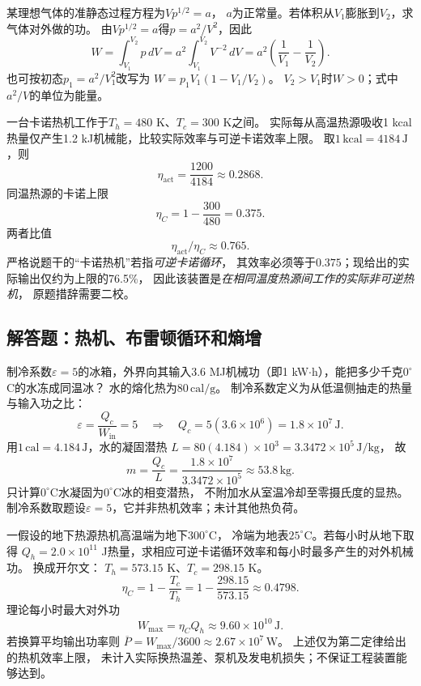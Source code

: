 \problemtext 某理想气体的准静态过程方程为$Vp^{1/2}=a$，
$a$为正常量。若体积从$V_1$膨胀到$V_2$，求气体对外做的功。
\workings
由$Vp^{1/2}=a$得$p=a^2/V^2$，因此
\[
W=\int_{V_1}^{V_2}p\,dV
=a^2\int_{V_1}^{V_2}V^{-2}\,dV
=\boxed{a^2\left(\frac1{V_1}-\frac1{V_2}\right)}.
\]
也可按初态$p_1=a^2/V_1^2$改写为
$\boxed{W=p_1V_1(1-V_1/V_2)}$。
\crosscheck $V_2>V_1$时$W>0$；式中$a^2/V$的单位为能量。

\problemtext 一台卡诺热机工作于$T_h=480$ K、$T_c=300$ K之间。
实际每从高温热源吸收1 kcal热量仅产生1.2 kJ机械能，比较实际效率与可逆卡诺效率上限。
\workings
取$1\,\mathrm{kcal}=4184\,\mathrm J$，则
\[
\boxed{\eta_{\mathrm{act}}=\frac{1200}{4184}
\approx0.2868}.
\]
同温热源的卡诺上限
\[
\boxed{\eta_C=1-\frac{300}{480}=0.375}.
\]
两者比值
\[
\boxed{\eta_{\mathrm{act}}/\eta_C\approx0.765}.
\]
\crosscheck 严格说题干的“卡诺热机”若指\emph{可逆卡诺循环}，
其效率必须等于$0.375$；现给出的实际输出仅约为上限的76.5\%，
因此该装置是\emph{在相同温度热源间工作的实际非可逆热机}，
原题措辞需要二校。

\subsection{解答题：热机、布雷顿循环和熵增}

\problemtext 制冷系数$\varepsilon=5$的冰箱，外界向其输入3.6 MJ机械功（即1 kW$\cdot$h），能把多少千克$0^\circ$C的水冻成同温冰？
水的熔化热为$80\,\mathrm{cal/g}$。
\workings
制冷系数定义为从低温侧抽走的热量与输入功之比：
\[
\varepsilon=\frac{Q_c}{W_{\mathrm{in}}}=5
\quad\Longrightarrow\quad
Q_c=5(3.6\times10^6)=1.8\times10^7\,\mathrm J.
\]
用$1\,\mathrm{cal}=4.184\,\mathrm J$，水的凝固潜热
$L=80(4.184)\times10^3=3.3472\times10^5\,\mathrm{J/kg}$，
故
\[
\boxed{m=\frac{Q_c}{L}
=\frac{1.8\times10^7}{3.3472\times10^5}
\approx53.8\,\mathrm{kg}}.
\]
\crosscheck 只计算$0^\circ$C水凝固为$0^\circ$C冰的相变潜热，
不附加水从室温冷却至零摄氏度的显热。制冷系数取题设$\varepsilon=5$，它并非热机效率；未计其他热负荷。

\problemtext 一假设的地下热源热机高温端为地下$300^\circ$C，
冷端为地表$25^\circ$C。若每小时从地下取得
$Q_h=2.0\times10^{11}$ J热量，求相应可逆卡诺循环效率和每小时最多产生的对外机械功。
\workings
换成开尔文：
$T_h=573.15$ K、$T_c=298.15$ K。
\[
\boxed{\eta_C=1-\frac{T_c}{T_h}
=1-\frac{298.15}{573.15}
\approx0.4798}.
\]
理论每小时最大对外功
\[
\boxed{W_{\max}=\eta_CQ_h
\approx9.60\times10^{10}\,\mathrm J}.
\]
若换算平均输出功率则
$\overline P=W_{\max}/3600\approx2.67\times10^7\,\mathrm W$。
\crosscheck 上述仅为第二定律给出的热机效率上限，
未计入实际换热温差、泵机及发电机损失；不保证工程装置能够达到。

